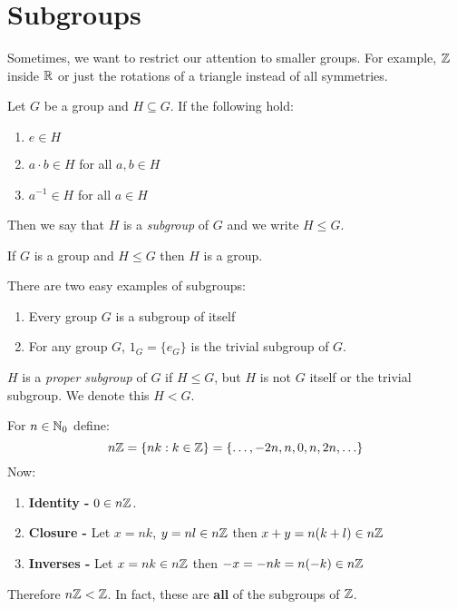 \documentclass[../main.tex]{subfiles}
\begin{document}
\section{Subgroups}
Sometimes, we want to restrict our attention to smaller groups. For example, $\mathbb{Z}$ inside $\mathbb{R}$ or just the rotations of a triangle instead of all symmetries.
\begin{definition}[Subgroup]
  Let $G$ be a group and $H \subseteq G$. If the following hold:
  \begin{enumerate}
    \item $e \in H$
    \item $a \cdot b \in H$ for all $a, b \in H$
    \item $a^{-1} \in H$ for all $a \in H$
  \end{enumerate}
  Then we say that $H$ is a \textit{subgroup} of $G$ and we write $H \leq G$.
\end{definition}
\begin{remark}
  If $G$ is a group and $H \leq G$ then $H$ is a group.
\end{remark}
\begin{example}
  There are two easy examples of subgroups:
  \begin{enumerate}
    \item Every group $G$ is a subgroup of itself
    \item For any group $G$, $1_G = \{e_G\}$ is the trivial subgroup of $G$.
  \end{enumerate}
\end{example}
\begin{definition}
  $H$ is a \textit{proper subgroup} of $G$ if $H \leq G$, but $H$ is not $G$ itself or the trivial subgroup.
  We denote this $H < G$.
\end{definition}
\begin{example}
  For $n \in \mathbb{N}_0$ define:
  \[
    n\mathbb{Z} = \{nk : k \in \mathbb{Z}\} = \{\ldots, -2n, n, 0, n, 2n, \ldots\}
  \]
  Now:
  \begin{enumerate}
    \item \textbf{Identity -} $0 \in n\mathbb{Z}$.
    \item \textbf{Closure -} Let $x = nk$, $y = nl \in n\mathbb{Z}$ then $x + y = n(k + l) \in n\mathbb{Z}$
    \item \textbf{Inverses -} Let $x = nk \in n\mathbb{Z}$ then $-x = -nk = n(-k) \in n\mathbb{Z}$
  \end{enumerate}
  Therefore $n\mathbb{Z} < \mathbb{Z}$.
  In fact, these are \textbf{all} of the subgroups of $\mathbb{Z}$.
\end{example}
\end{document}
